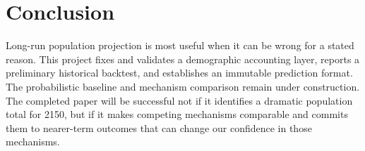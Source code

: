 \section{Conclusion}

Long-run population projection is most useful when it can be wrong for a stated
reason. This project fixes and validates a demographic accounting layer,
reports a preliminary historical backtest, and establishes an immutable
prediction format. The probabilistic baseline and mechanism comparison remain
under construction. The completed paper will be successful not if it identifies
a dramatic population total for 2150, but if it makes competing mechanisms
comparable and commits them to nearer-term outcomes that can change our
confidence in those mechanisms.
